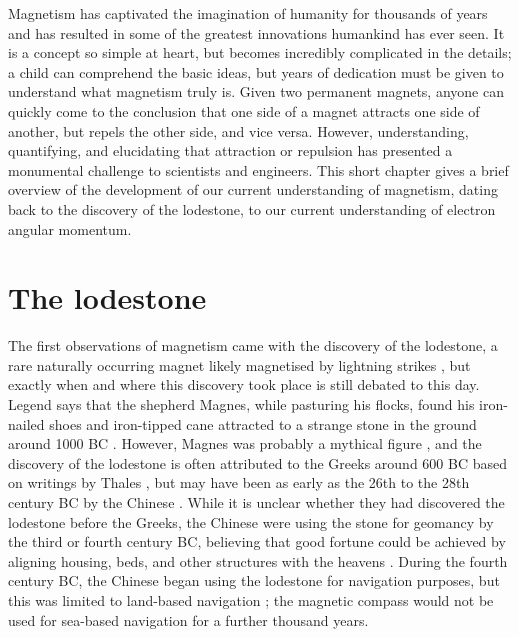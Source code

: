 Magnetism has captivated the imagination of humanity for thousands of years and has resulted in some of the greatest innovations humankind has ever seen. It is a concept so simple at heart, but becomes incredibly complicated in the details; a child can comprehend the basic ideas, but years of dedication must be given to understand what magnetism truly is. Given two permanent magnets, anyone can quickly come to the conclusion that one side of a magnet attracts one side of another, but repels the other side, and vice versa. However, understanding, quantifying, and elucidating that attraction or repulsion has presented a monumental challenge to scientists and engineers. This short chapter gives a brief overview of the development of our current understanding of magnetism, dating back to the discovery of the lodestone, to our current understanding of electron angular momentum.

\section*{The lodestone}
The first observations of magnetism came with the discovery of the lodestone, a rare naturally occurring magnet likely magnetised by lightning strikes \cite{Blundell2012}, but exactly when and where this discovery took place is still debated to this day. Legend says that the shepherd Magnes, while pasturing his flocks, found his iron-nailed shoes and iron-tipped cane attracted to a strange stone in the ground around 1000 BC \cite{Mourino1991,Stohr2006,Hafeli1997,Stoner1934}. However, Magnes was probably a mythical figure \cite{Mourino1991}, and the discovery of the lodestone is often attributed to the Greeks around 600 BC based on writings by Thales \cite{Mills2004,Stohr2006,Stoner1934,Morrish1965}, but may have been as early as the 26th to the 28th century BC by the Chinese \cite{Hafeli1997,Mattis1981,Stoner1934,Morrish1965}. While it is unclear whether they had discovered the lodestone before the Greeks, the Chinese were using the stone for geomancy by the third or fourth century BC, believing that good fortune could be achieved by aligning housing, beds, and other structures with the heavens \cite{Hafeli1997,Stohr2006}. During the fourth century BC, the Chinese began using the lodestone for navigation purposes, but this was limited to land-based navigation \cite{Hafeli1997}; the magnetic compass would not be used for sea-based navigation for a further thousand years.

